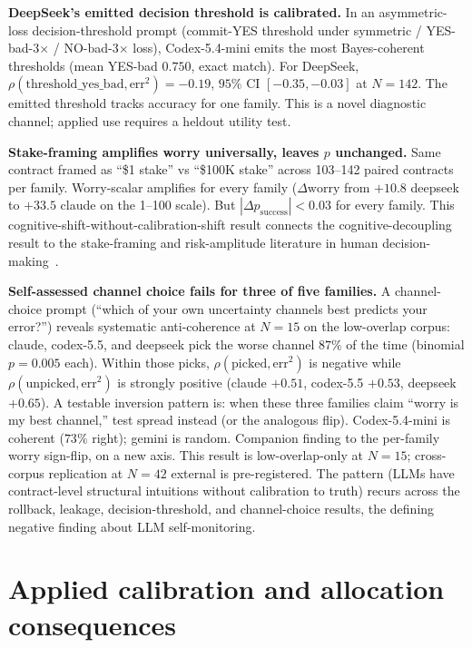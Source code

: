 \documentclass[11pt]{article}
\begin{document}
\textbf{DeepSeek's emitted decision threshold is calibrated.} In an asymmetric-loss decision-threshold prompt (commit-YES threshold under symmetric / YES-bad-3$\times$ / NO-bad-3$\times$ loss), Codex-5.4-mini emits the most Bayes-coherent thresholds (mean YES-bad $0.750$, exact match). For DeepSeek, $\rho(\text{threshold\_yes\_bad}, \text{err}^2) = -0.19$, $95\%$ CI $[-0.35, -0.03]$ at $N{=}142$. The emitted threshold tracks accuracy for one family. This is a novel diagnostic channel; applied use requires a heldout utility test.

\textbf{Stake-framing amplifies worry universally, leaves $p$ unchanged.} Same contract framed as ``\$1 stake'' vs ``\$100K stake'' across 103--142 paired contracts per family. Worry-scalar amplifies for every family ($\Delta\text{worry}$ from $+10.8$ deepseek to $+33.5$ claude on the 1--100 scale). But $|\Delta p_{\mathrm{success}}| < 0.03$ for every family. This cognitive-shift-without-calibration-shift result connects the cognitive-decoupling result to the stake-framing and risk-amplitude literature in human decision-making~\cite{holt2002risk}.

\textbf{Self-assessed channel choice fails for three of five families.} A channel-choice prompt (``which of your own uncertainty channels best predicts your error?'') reveals systematic anti-coherence at $N{=}15$ on the low-overlap corpus: claude, codex-5.5, and deepseek pick the worse channel $87\%$ of the time (binomial $p{=}0.005$ each). Within those picks, $\rho(\text{picked}, \text{err}^2)$ is negative while $\rho(\text{unpicked}, \text{err}^2)$ is strongly positive (claude $+0.51$, codex-5.5 $+0.53$, deepseek $+0.65$). A testable inversion pattern is: when these three families claim ``worry is my best channel,'' test spread instead (or the analogous flip). Codex-5.4-mini is coherent ($73\%$ right); gemini is random. Companion finding to the per-family worry sign-flip, on a new axis. This result is low-overlap-only at $N{=}15$; cross-corpus replication at $N{=}42$ external is pre-registered. The pattern (LLMs have contract-level structural intuitions without calibration to truth) recurs across the rollback, leakage, decision-threshold, and channel-choice results, the defining negative finding about LLM self-monitoring.

\section{Applied calibration and allocation consequences}
\label{sec:universal}
\end{document}
